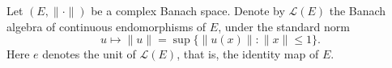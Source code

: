 Let $(E, \|\cdot\|)$ be a complex Banach space. Denote by $\mathcal{L}(E)$ the Banach algebra of continuous endomorphisms of $E$, under the standard norm
$$u \mapsto \|u\| = \sup\{ \|u(x)\| : \|x\| \leq 1 \}.$$
Here $e$ denotes the unit of $\mathcal{L}(E)$, that is, the identity map of $E$.
